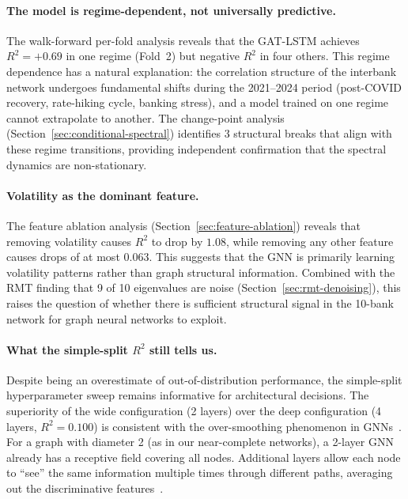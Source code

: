 \paragraph{The model is regime-dependent, not universally predictive.}
The walk-forward per-fold analysis reveals that the GAT-LSTM achieves $R^2 = +0.69$ in one regime (Fold~2) but negative $R^2$ in four others. This regime dependence has a natural explanation: the correlation structure of the interbank network undergoes fundamental shifts during the 2021--2024 period (post-COVID recovery, rate-hiking cycle, banking stress), and a model trained on one regime cannot extrapolate to another. The change-point analysis (Section~\ref{sec:conditional-spectral}) identifies 3 structural breaks that align with these regime transitions, providing independent confirmation that the spectral dynamics are non-stationary.

\paragraph{Volatility as the dominant feature.}
The feature ablation analysis (Section~\ref{sec:feature-ablation}) reveals that removing volatility causes $R^2$ to drop by $1.08$, while removing any other feature causes drops of at most $0.063$. This suggests that the GNN is primarily learning volatility patterns rather than graph structural information. Combined with the RMT finding that 9 of 10 eigenvalues are noise (Section~\ref{sec:rmt-denoising}), this raises the question of whether there is sufficient structural signal in the 10-bank network for graph neural networks to exploit.

\paragraph{What the simple-split $R^2$ still tells us.}
Despite being an overestimate of out-of-distribution performance, the simple-split hyperparameter sweep remains informative for architectural decisions. The superiority of the wide configuration (2 layers) over the deep configuration (4 layers, $R^2 = 0.100$) is consistent with the over-smoothing phenomenon in GNNs~\cite{kipf2017semi,defferrard2016convolutional}. For a graph with diameter 2 (as in our near-complete networks), a 2-layer GNN already has a receptive field covering all nodes. Additional layers allow each node to ``see'' the same information multiple times through different paths, averaging out the discriminative features~\cite{kipf2017semi}.

